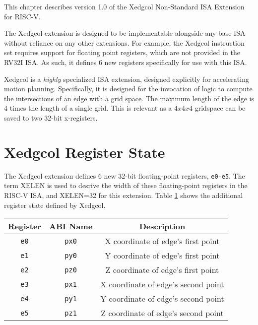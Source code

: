 
This chapter describes version 1.0 of the Xedgcol Non-Standard ISA Extension for RISC-V.

The Xedgcol extension is designed to be implementable alongside any base ISA without reliance on any other extensions. For example, the Xedgcol instruction set requires support for floating point registers, which are not provided in the RV32I ISA. As such, it defines 6 new registers specifically for use with this ISA.

Xedgcol is a \textit{highly} specialized ISA extension, designed explicitly for accelerating motion planning.
Specifically, it is designed for the invocation of logic to compute the intersections of an edge with a grid space. The maximum length of the edge is 4 times the length of a single grid. This is relevant as a $4x4x4$ gridspace can be saved to two 32-bit x-registers.

\section{Xedgcol Register State}
The Xedgcol extension defines 6 new 32-bit floating-point registers, \texttt{e0-e5}. The term XELEN is used to desrive the width of these floating-point registers in the RISC-V ISA, and XELEN=32 for this extension.
Table \ref{table:Xedgcol_registers} shows the additional register state defined by Xedgcol. 
\begin{table}[H]
\begin{center}
\begin{tabular}{|c|c|c|}
\hline
\textbf{Register} & \textbf{ABI Name} & \textbf{Description} \\
\hline
\texttt{e0}     & \texttt{px0}      & X coordinate of edge's first point \\
\hline
\texttt{e1}     & \texttt{py0}      & Y coordinate of edge's first point \\
\hline
\texttt{e2}     & \texttt{pz0}      & Z coordinate of edge's first point \\
\hline
\texttt{e3}     & \texttt{px1}      & X coordinate of edge's second point \\
\hline
\texttt{e4}     & \texttt{py1}      & Y coordinate of edge's second point \\
\hline
\texttt{e5}     & \texttt{pz1}      & Z coordinate of edge's second point \\
\hline
\end{tabular}
\label{table:Xedgcol_registers}
\end{center}
\end{table}

